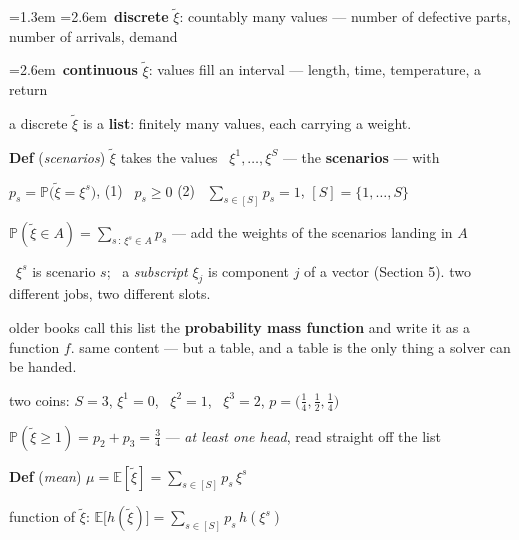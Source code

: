 \documentclass[10pt]{article}
\newenvironment{board}{%
  \par\vspace{4pt}
  \begingroup\leftskip=1.3em\relax\parskip=2pt\relax}{%
  \par\endgroup\vspace{4pt}}
\newcommand{\bul}{\hangindent=2.6em\hangafter=1\hspace{1.2em}\textbullet\ \ignorespaces}
\begin{document}
\begin{board}
\bul \textbf{discrete} $\tilde\xi$: countably many values --- number of defective parts, number of arrivals, demand
\vspace{3pt}

\bul \textbf{continuous} $\tilde\xi$: values fill an interval --- length, time, temperature, a return
\vspace{6pt}

a discrete $\tilde\xi$ is a \textbf{list}: finitely many values, each carrying a weight.
\vspace{10pt}

\textbf{Def} (\emph{scenarios}) \quad $\tilde\xi$ takes the values \ $\xi^1, \dots, \xi^S$ --- the \textbf{scenarios} --- with
\vspace{4pt}

\quad $p_s = \mathbb{P}\big(\tilde\xi = \xi^s\big)$, \qquad
(1) \ $p_s \ge 0$ \qquad (2) \ $\sum_{s \in [S]} p_s = 1$, \qquad $[S] = \{1, \dots, S\}$
\vspace{4pt}

\quad $\mathbb{P}(\tilde\xi \in A) = \sum_{s \,:\, \xi^s \in A} p_s$ \qquad --- add the weights of the scenarios landing in $A$
\vspace{6pt}

 \ $\xi^s$ is scenario $s$; \ a \emph{subscript} $\xi_j$ is
      component $j$ of a vector (Section 5). two different jobs, two different slots.
\vspace{6pt}

\quad older books call this list the \textbf{probability mass function} and write it as a function $f$.
      same content --- but a table, and a table is the only thing a solver can be handed.
\vspace{10pt}

\quad two coins: \quad $S = 3$, \qquad $\xi^1 = 0$, \ $\xi^2 = 1$, \ $\xi^3 = 2$, \qquad
      $p = \big(\tfrac14, \tfrac12, \tfrac14\big)$
\vspace{3pt}

\quad $\mathbb{P}(\tilde\xi \ge 1) = p_2 + p_3 = \tfrac34$ \qquad --- \emph{at least one head}, read straight off the list
\vspace{12pt}

\textbf{Def} (\emph{mean}) \quad $\mu = \mathbb{E}[\tilde\xi] = \sum_{s \in [S]} p_s\, \xi^s$
\vspace{6pt}

\quad function of $\tilde\xi$: \quad $\mathbb{E}\big[h(\tilde\xi)\big] = \sum_{s \in [S]} p_s\, h(\xi^s)$
\vspace{3pt}


\end{board}
\end{document}
